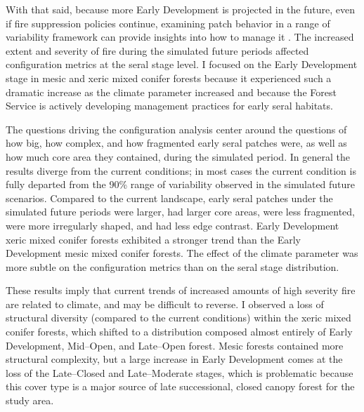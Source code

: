 With that said, because more Early Development is projected in the future, even if fire suppression policies continue, examining patch behavior in a range of variability framework can provide insights into how to manage it \citep{McGarigal2005a,McGarigal2005}. The increased extent and severity of fire during the simulated future periods affected configuration metrics at the seral stage level. I focused on the Early Development stage in mesic and xeric mixed conifer forests because it experienced such a dramatic increase as the climate parameter increased and because the Forest Service is actively developing management practices for early seral habitats. 

The questions driving the configuration analysis center around the questions of how big, how complex, and how fragmented early seral patches were, as well as how much core area they contained, during the simulated period. In general the results diverge from the current conditions; in most cases the current condition is fully departed from the 90\% range of variability observed in the simulated future scenarios. Compared to the current landscape, early seral patches under the simulated future periods were larger, had larger core areas, were less fragmented, were more irregularly shaped, and had less edge contrast. Early Development xeric mixed conifer forests exhibited a stronger trend than the Early Development mesic mixed conifer forests. The effect of the climate parameter was more subtle on the configuration metrics than on the seral stage distribution.

These results imply that current trends of increased amounts of high severity fire \citep{Miller2012,Mallek2013} are related to climate, and may be difficult to reverse. I observed a loss of structural diversity (compared to the current conditions) within the xeric mixed conifer forests, which shifted to a distribution composed almost entirely of Early Development, Mid--Open, and Late--Open forest. Mesic forests contained more structural complexity, but a large increase in Early Development comes at the loss of the Late--Closed and Late--Moderate stages, which is problematic because this cover type is a major source of late successional, closed canopy forest for the study area.

